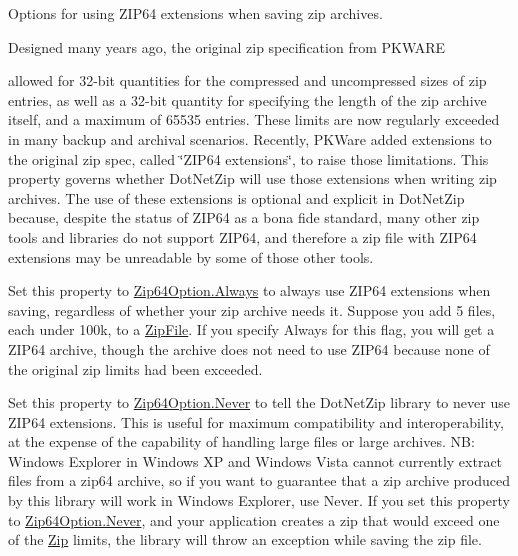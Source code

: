 Options for using Z\+I\+P64 extensions when saving zip archives. 

Designed many years ago, the original zip specification from P\+K\+W\+A\+RE

allowed for 32-\/bit quantities for the compressed and uncompressed sizes of zip entries, as well as a 32-\/bit quantity for specifying the length of the zip archive itself, and a maximum of 65535 entries. These limits are now regularly exceeded in many backup and archival scenarios. Recently, P\+K\+Ware added extensions to the original zip spec, called \char`\"{}\+Z\+I\+P64 extensions\char`\"{}, to raise those limitations. This property governs whether Dot\+Net\+Zip will use those extensions when writing zip archives. The use of these extensions is optional and explicit in Dot\+Net\+Zip because, despite the status of Z\+I\+P64 as a bona fide standard, many other zip tools and libraries do not support Z\+I\+P64, and therefore a zip file with Z\+I\+P64 extensions may be unreadable by some of those other tools. 

Set this property to \mbox{\hyperlink{namespace_super_tiled2_unity_1_1_ionic_1_1_zip_a0c873ba2a5b73de966e876643830dc69a68eec46437c384d8dad18d5464ebc35c}{Zip64\+Option.\+Always}} to always use Z\+I\+P64 extensions when saving, regardless of whether your zip archive needs it. Suppose you add 5 files, each under 100k, to a \mbox{\hyperlink{class_super_tiled2_unity_1_1_ionic_1_1_zip_1_1_zip_file}{Zip\+File}}. If you specify Always for this flag, you will get a Z\+I\+P64 archive, though the archive does not need to use Z\+I\+P64 because none of the original zip limits had been exceeded. 

Set this property to \mbox{\hyperlink{namespace_super_tiled2_unity_1_1_ionic_1_1_zip_a0c873ba2a5b73de966e876643830dc69a6e7b34fa59e1bd229b207892956dc41c}{Zip64\+Option.\+Never}} to tell the Dot\+Net\+Zip library to never use Z\+I\+P64 extensions. This is useful for maximum compatibility and interoperability, at the expense of the capability of handling large files or large archives. NB\+: Windows Explorer in Windows XP and Windows Vista cannot currently extract files from a zip64 archive, so if you want to guarantee that a zip archive produced by this library will work in Windows Explorer, use {\ttfamily Never}. If you set this property to \mbox{\hyperlink{namespace_super_tiled2_unity_1_1_ionic_1_1_zip_a0c873ba2a5b73de966e876643830dc69a6e7b34fa59e1bd229b207892956dc41c}{Zip64\+Option.\+Never}}, and your application creates a zip that would exceed one of the \mbox{\hyperlink{namespace_super_tiled2_unity_1_1_ionic_1_1_zip}{Zip}} limits, the library will throw an exception while saving the zip file. 

